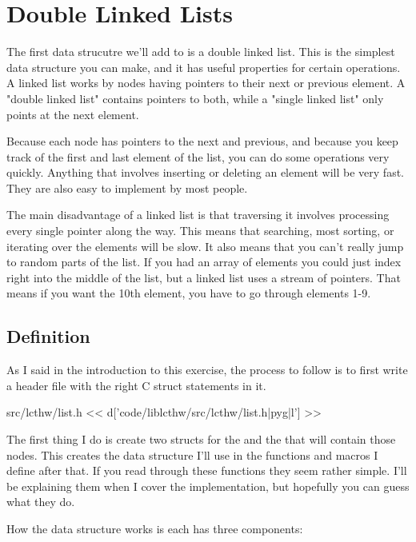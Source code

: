 \section{Double Linked Lists}

The first data strucutre we'll add to  is a double linked list.
This is the simplest data structure you can make, and it has useful properties
for certain operations.  A linked list works by nodes having pointers to their
next or previous element.  A "double linked list" contains pointers to both,
while a "single linked list" only points at the next element.

Because each node has pointers to the next and previous, and because you
keep track of the first and last element of the list, you can do some operations
very quickly.  Anything that involves inserting or deleting an element 
will be very fast.  They are also easy to implement by most people.

The main disadvantage of a linked list is that traversing it involves
processing every single pointer along the way.  This means that searching,
most sorting, or iterating over the elements will be slow.  It also means
that you can't really jump to random parts of the list.  If you had an 
array of elements you could just index right into the middle of the list,
but a linked list uses a stream of pointers.  That means if you want
the 10th element, you have to go through elements 1-9.

\subsection{Definition}

As I said in the introduction to this exercise, the process to follow is
to first write a header file with the right C struct statements in it.

\begin{code}{src/lcthw/list.h}
<< d['code/liblcthw/src/lcthw/list.h|pyg|l'] >>
\end{code}

The first thing I do is create two structs for the  and
the  that will contain those nodes.  This creates the data
structure I'll use in the functions and macros I define after that.  If
you read through these functions they seem rather simple.  I'll be 
explaining them when I cover the implementation, but hopefully you can
guess what they do.

How the data structure works is each  has three components:

